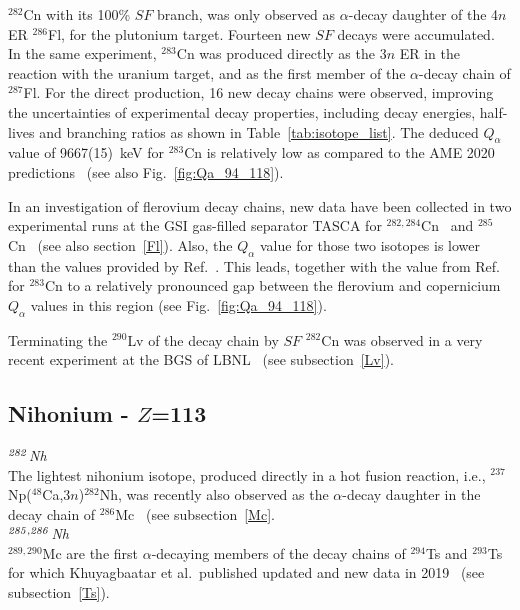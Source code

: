 $^{282}$Cn with its 100\% $SF$ branch, was only observed as $\alpha$-decay daughter of the 4$n$ ER $^{286}$Fl, for the plutonium target.
Fourteen new $SF$ decays were accumulated.
In the same experiment, $^{283}$Cn was produced directly as the $3n$ ER in the reaction with the uranium target, and as the first member of the $\alpha$-decay chain of  $^{287}$Fl.
For the direct production, 16 new decay chains were observed, improving the uncertainties of experimental decay properties, including decay energies, half-lives and branching ratios as shown in Table~\ref{tab:isotope_list}.
The deduced $Q_\alpha$ value of 9667(15)~keV for $^{283}$Cn is relatively low as compared to the AME 2020 predictions~\cite{Wang2021} (see also Fig.~\ref{fig:Qa_94_118}).

In an investigation of flerovium decay chains, new data have been collected in two experimental runs at the GSI gas-filled separator TASCA for $^{282,284}$Cn~\cite{Samark-Roth2021,Samark-Roth2023} and $^{285}$Cn~\cite{Cox2023} (see also section~\ref{Fl}).
Also, the $Q_\alpha$ value for those two isotopes is lower than the values provided by Ref.~\cite{Wang2021}. 
This leads, together with the value from Ref.\cite{Oganessian2022b} for $^{283}$Cn to a relatively pronounced gap between the flerovium and copernicium $Q_\alpha$ values in this region (see Fig.~\ref{fig:Qa_94_118}).

Terminating the $^{290}$Lv of the decay chain by $SF$ $^{282}$Cn was observed in a very recent experiment at the BGS of LBNL~\cite{Gates2024} (see subsection~\ref{Lv}).
\\


\subsection{Nihonium - $Z$=113}\label{Nh}


{\it $^{\it282}$Nh}\\
The lightest nihonium isotope, produced directly in a hot fusion reaction, i.e., $^{237}$Np($^{48}$Ca,$3n$)$^{282}$Nh,  was recently also observed as the $\alpha$-decay daughter in the decay chain of $^{286}$Mc~\cite{Oganessian2022c} (see subsection~\ref{Mc}.\\

{\it $^{\it285,286}$Nh}\\
$^{289,290}$Mc are the first $\alpha$-decaying members of the decay chains of $^{294}$Ts and $^{293}$Ts for which Khuyagbaatar et al.~published updated and new data in 2019~\cite{Khuyagbaatar2019} (see subsection~\ref{Ts}).

